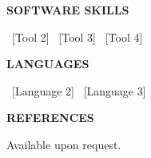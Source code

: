 \documentclass[10pt,a4paper]{article}
\newenvironment{cvsection}[1]{%
  \noindent
  \begin{minipage}[t]{0.16\linewidth}
    \bfseries\MakeUppercase{#1}
  \end{minipage}%
  \hspace{0.02\linewidth}%
  \begin{minipage}[t]{0.80\linewidth}
}{%
  \end{minipage}\par\vspace{10pt}
}
\newcommand{\cvblock}[1]{\noindent#1\par\vspace{4pt}}
\begin{document}
\begin{cvsection}{Software Skills}
\cvblock{[Tool 1] \textbullet\ [Tool 2] \textbullet\ [Tool 3] \textbullet\ [Tool 4]}
\end{cvsection}

\begin{cvsection}{Languages}
\cvblock{[Language 1] \textbullet\ [Language 2] \textbullet\ [Language 3]}
\end{cvsection}

\begin{cvsection}{References}
\cvblock{Available upon request.}
\end{cvsection}
\end{document}
